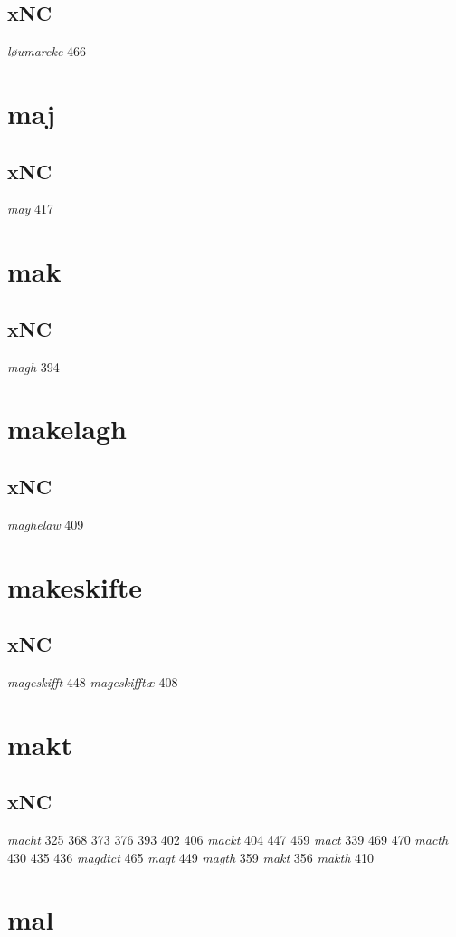\documentclass[a4paper,twocolumn]{article}
\begin{document}
\subsection{xNC}
\label{sec:orga54aac1}
\emph{løumarcke} 466 
\section{maj}
\label{sec:orgd650498}
\subsection{xNC}
\label{sec:org12375fe}
\emph{may} 417 
\section{mak}
\label{sec:org1bb4970}
\subsection{xNC}
\label{sec:org90d2f61}
\emph{magh} 394 
\section{makelagh}
\label{sec:org889395c}
\subsection{xNC}
\label{sec:org208f6bb}
\emph{maghelaw} 409 
\section{makeskifte}
\label{sec:orge5a8b0c}
\subsection{xNC}
\label{sec:org35a685d}
\emph{mageskifft} 448 \emph{mageskifftæ} 408 
\section{makt}
\label{sec:orgab9c858}
\subsection{xNC}
\label{sec:org9d44ae3}
\emph{macht} 325 368 373 376 393 402 406 \emph{mackt} 404 447 459 \emph{mact} 339 469 470 \emph{macth} 430 435 436 \emph{magdtct} 465 \emph{magt} 449 \emph{magth} 359 \emph{makt} 356 \emph{makth} 410 
\section{mal}
\label{sec:orga14da2b}
\end{document}
